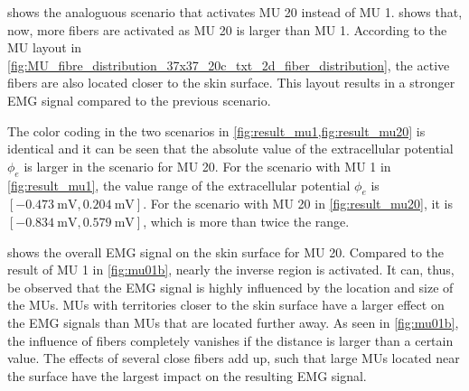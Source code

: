  shows the analoguous scenario that activates MU 20 instead of MU 1.  shows that, now, more fibers are activated as MU 20 is larger than MU 1. According to the MU layout in \cref{fig:MU_fibre_distribution_37x37_20c_txt_2d_fiber_distribution}, the active fibers are also located closer to the skin surface. This layout results in a stronger EMG signal compared to the previous scenario. 

The color coding in the two scenarios in \cref{fig:result_mu1,fig:result_mu20} is identical and it can be seen that the absolute value of the extracellular potential $\phi_e$ is larger in the scenario for MU 20. For the scenario with MU 1 in \cref{fig:result_mu1}, the value range of the extracellular potential $\phi_e$ is $[\SI{-0.473}{\milli\volt}, \SI{0.204}{\milli\volt}]$. For the scenario with MU 20 in \cref{fig:result_mu20}, it is $[\SI{-0.834}{\milli\volt}, \SI{0.579}{\milli\volt}]$, which is more than twice the range.

 shows the overall EMG signal on the skin surface for MU 20. Compared to the result of MU 1 in \cref{fig:mu01b}, nearly the inverse region is activated. It can, thus, be observed that the EMG signal is highly influenced by the location and size of the MUs. MUs with territories closer to the skin surface have a larger effect on the EMG signals than MUs that are located further away. As seen in \cref{fig:mu01b}, the influence of fibers completely vanishes if the distance is larger than a certain value. The effects of several close fibers add up, such that large MUs located near the surface have the largest impact on the resulting EMG signal.

